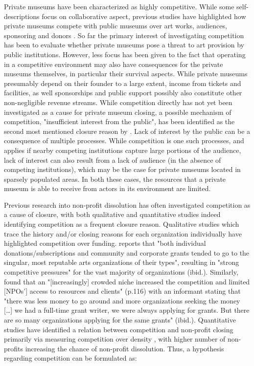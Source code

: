 \documentclass[12pt]{article}
\begin{document}
Private museums have been characterized as highly competitive.
While some self-descriptions focus on collaborative aspect, previous studies have highlighted how private museums compete with public museums over art works, audiences, sponsoring and donors \parencite[p.4]{Kolbe_etal_2022_privatemuseum}. 
So far the primary interest of investigating competition has been to evaluate whether private museums pose a threat to art provision by public institutions.
However, less focus has been given to the fact that operating in a competitive environment may also have consequences for the private museums themselves, in particular their survival aspects.
While private museums presumably depend on their founder to a large extent, income from tickets and facilities, as well sponsorships and public support possibly also constitute other non-negligible revenue streams.
While competition directly has not yet been investigated as a cause for private museum closing, a possible mechanism of competition, "insufficient interest from the public", has been identified as the second most mentioned closure reason by \textcite[p.6]{Velthuis_Gera_2024_fragility}. 
Lack of interest by the public can be a consequence of multiple processes.
While competition is one such processes, and applies if nearby competing institutions capture large portions of the audience, lack of interest can also result from a lack of audience (in the absence of competing institutions), which may be the case for private museums located in sparsely populated areas.
In both these cases, the resources that a private museum is able to receive from actors in its environment are limited. 



Previous research into non-profit dissolution has often investigated competition as a cause of closure, with both qualitative and quantitative studies indeed identifying competition as a frequent closure reason.
Qualitative studies which trace the history and/or closing reasons for each organization individually have highlighted competition over funding.
\textcite{Hager_1999_demise} reports that "both individual donations/subscriptions and community and corporate grants tended to go to the singular, most reputable arts organizations of their types", resulting in "strong competitive pressures" for the vast majority of organizations (ibid.).
Similarly, \textcite{HernandezOrtiz_2022_discontinuity} found that an "[increasingly] crowded niche increased the competition and limited [NPOs'] access to resources and clients" (p.116) with an informant stating that "there was less money to go around and more organizations seeking the money [\ldots{}] we had a full-time grant writer, we were always applying for grants. But there are so many organizations applying for the same grants" (ibid.).
Quantitative studies have identified a relation between competition and non-profit closing primarily via measuring competition over density \parencite{Park_Shon_Lu_2021_mortality,Haugh_etal_2021_nascent,Lu_Shon_Zhang_2019_dissolution}, with higher number of non-profits increasing the chance of non-profit dissolution.
Thus, a hypothesis regarding competition can be formulated as:
\end{document}
